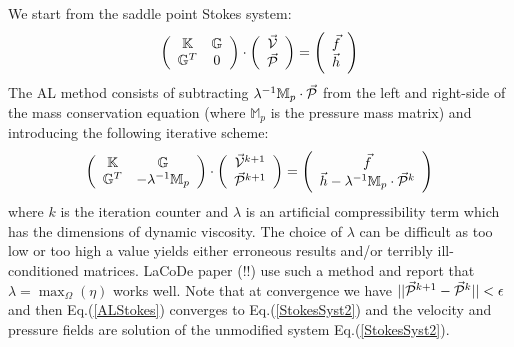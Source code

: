 We start from the saddle point Stokes system:
\begin{equation}
\left(
\begin{array}{cc}
{\mathbb{K}} & {\mathbb{G}} \\ {\mathbb{G}}^T & 0 
\end{array}
\right)
\cdot
\left(
\begin{array}{c}
\vec{\cal V} \\ \vec{\cal P}
\end{array}
\right)
=
\left(
\begin{array}{c}
\vec{f} \\ \vec{h}
\end{array}
\right)
\label{StokesSyst2}
\end{equation}
The AL method consists of subtracting $\lambda^{-1} \mathbb{M}_p \cdot \vec{\cal P}$ from the left and 
right-side of the mass conservation equation (where $\mathbb{M}_p$ is the pressure mass matrix) 
and introducing the following iterative scheme:
\begin{equation}
\left(
\begin{array}{cc}
{\mathbb{K}} & {\mathbb{G}} \\ {\mathbb{G}}^T & -\lambda^{-1} \mathbb{M}_p
\end{array}
\right)
\cdot
\left(
\begin{array}{c}
\vec{\cal V}^{k+1} \\ \vec{\cal P}^{k+1}
\end{array}
\right)
=
\left(
\begin{array}{c}
\vec{f} \\ \vec{h} - \lambda^{-1} \mathbb{M}_p \cdot \vec{\cal P}^k
\end{array}
\right)
\label{ALStokes}
\end{equation}
where $k$ is the iteration counter and $\lambda$ is an artificial compressibility term which has 
the dimensions of dynamic viscosity. 
The choice of $\lambda$ can be difficult as too low or too high a value yields either erroneous results and/or terribly ill-conditioned matrices. LaCoDe paper (!!) use such a method and report that $\lambda=\max_\Omega({\eta})$
works well. 
Note that at convergence we have $||\vec{\cal P}^{k+1}-\vec{\cal P}^k||<\epsilon$ and then Eq.(\ref{ALStokes}) converges to Eq.(\ref{StokesSyst2}) and the velocity and pressure fields are solution of the unmodified system Eq.(\ref{StokesSyst2}).

